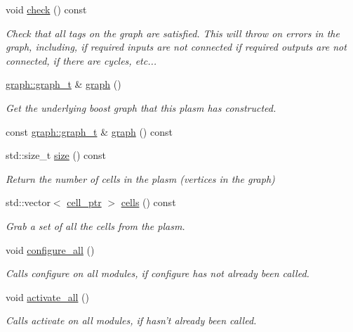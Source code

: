 \begin{DoxyCompactItemize}
void \hyperlink{structecto_1_1plasm_a9554edd5758b8a83ed092a81e249f64a}{check} () const 
\begin{DoxyCompactList}\small\item\em \-Check that all tags on the graph are satisfied. \-This will throw on errors in the graph, including, if required inputs are not connected if required outputs are not connected, if there are cycles, etc... \end{DoxyCompactList}\item 
\hyperlink{structecto_1_1graph_1_1graph__t}{graph\-::graph\-\_\-t} \& \hyperlink{structecto_1_1plasm_a4f8de02440afdad0aa395fbaea03399e}{graph} ()
\begin{DoxyCompactList}\small\item\em \-Get the underlying boost graph that this plasm has constructed. \end{DoxyCompactList}\item 
const \hyperlink{structecto_1_1graph_1_1graph__t}{graph\-::graph\-\_\-t} \& \hyperlink{structecto_1_1plasm_ac6cde6d1d615e85f442ce299fdf0e7a0}{graph} () const 
\item 
std\-::size\-\_\-t \hyperlink{structecto_1_1plasm_aaeeabeb3f78c1a7291eb14e0f705574e}{size} () const 
\begin{DoxyCompactList}\small\item\em \-Return the number of cells in the plasm (vertices in the graph) \end{DoxyCompactList}\item 
std\-::vector$<$ \hyperlink{namespaceecto_aed1809e82b9229ea81ef9ee3438cf62c}{cell\-\_\-ptr} $>$ \hyperlink{structecto_1_1plasm_aa7724234d631563b10de07030c066e01}{cells} () const 
\begin{DoxyCompactList}\small\item\em \-Grab a set of all the cells from the plasm. \end{DoxyCompactList}\item 
void \hyperlink{structecto_1_1plasm_a55d56445bd1d09b9422390fb49e81bec}{configure\-\_\-all} ()
\begin{DoxyCompactList}\small\item\em \-Calls configure on all modules, if configure has not already been called. \end{DoxyCompactList}\item 
void \hyperlink{structecto_1_1plasm_a4419135c6c8dd8bb0cc7f4807a025df2}{activate\-\_\-all} ()
\begin{DoxyCompactList}\small\item\em \-Calls activate on all modules, if hasn't already been called. \end{DoxyCompactList}\item 

\end{DoxyCompactItemize}
